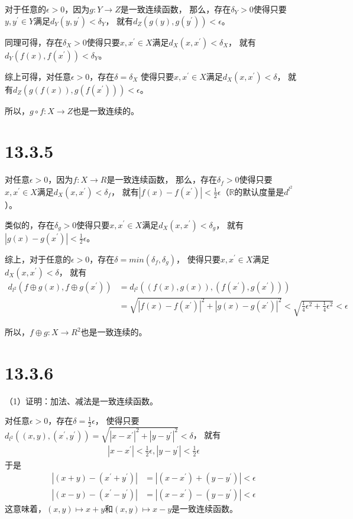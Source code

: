 \documentclass{article}
\begin{document}
对于任意的$\epsilon > 0$，因为$g: Y \to Z$是一致连续函数，
那么，存在$\delta_Y > 0$使得只要$y, y^\prime \in Y$满足$d_Y(y, y^\prime) < \delta_Y$，
就有$d_Z(g(y), g(y^\prime)) < \epsilon$。

同理可得，存在$\delta_X > 0$使得只要$x, x^\prime \in X$满足$d_X(x, x^\prime) < \delta_X$，
就有$d_Y(f(x), f(x^\prime)) < \delta_Y$。

综上可得，对任意$\epsilon > 0$，存在$\delta = \delta_X$
使得只要$x, x^\prime \in X$满足$d_X(x, x^\prime) < \delta$，
就有$d_Z(g(f(x)), g(f(x^\prime))) < \epsilon$。

所以，$g \circ f: X \to Z$也是一致连续的。

\section*{13.3.5}

对任意$\epsilon > 0$，因为$f: X \to R$是一致连续函数，
那么，存在$\delta_f > 0$使得只要$x, x^\prime \in X$满足$d_X(x, x^\prime) < \delta_f$，
就有$|f(x) - f(x^\prime)| < \frac{1}{2}\epsilon$（$\mathbb{R}$的默认度量是$d^{l^2}$）。

类似的，存在$\delta_g > 0$使得只要$x, x^\prime \in X$满足$d_X(x, x^\prime) < \delta_g$，
就有$|g(x) - g(x^\prime)| < \frac{1}{2}\epsilon$。

综上，对于任意的$\epsilon > 0$，存在$\delta = min(\delta_f, \delta_g)$，
使得只要$x, x^\prime \in X$满足$d_X(x, x^\prime) < \delta$，
就有
\begin{align*}
  d_{l^2}(f \oplus g(x), f \oplus g(x^\prime)) & = d_{l^2}((f(x), g(x)), (f(x^\prime), g(x^\prime))) \\
                                               & = \sqrt{|f(x) - f(x^\prime)|^2 + |g(x) - g(x^\prime)|^2} < \sqrt{\frac{1}{4}\epsilon^2 + \frac{1}{4}\epsilon^2} < \epsilon
\end{align*}

所以，$f \oplus g: X \to R^2$也是一致连续的。

\section*{13.3.6}

（1）证明：加法、减法是一致连续函数。

对任意$\epsilon > 0$，存在$\delta = \frac{1}{2}\epsilon$，
使得只要$d_{l^2}((x, y), (x^\prime, y^\prime)) = \sqrt{|x - x^\prime|^2 + |y - y^\prime|^2} < \delta$，
就有
\begin{align*}
  |x - x^\prime| < \frac{1}{2}\epsilon, |y - y^\prime| < \frac{1}{2}\epsilon
\end{align*}
于是
\begin{align*}
  |(x + y) - (x^\prime + y^\prime)| & =  |(x - x^\prime) + (y - y^\prime)| < \epsilon \\
  |(x - y) - (x^\prime - y^\prime)| & = |(x - x^\prime) - (y - y^\prime)| < \epsilon
\end{align*}
这意味着，$(x, y) \mapsto x + y$和$(x, y) \mapsto x - y$是一致连续函数。
\end{document}
